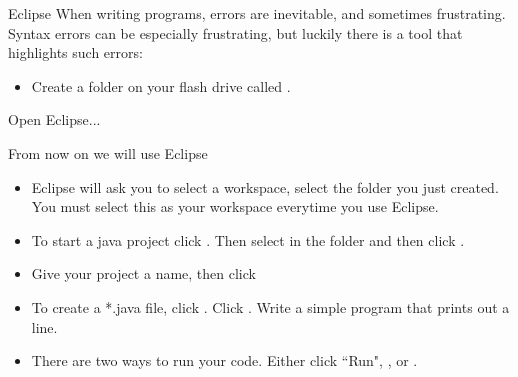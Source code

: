 \begin{frame}{Eclipse}
When writing programs, errors are inevitable, and sometimes frustrating. Syntax errors can be especially frustrating, but luckily there is a tool that highlights such errors:
\begin{itemize}
\item Create a folder on your flash drive called .
\end{itemize}

\begin{center}
Open Eclipse...
\end{center}
\end{frame}

\begin{frame}{From now on we will use Eclipse}
\begin{itemize}
\item Eclipse will ask you to select a workspace, select the  folder you just created. You must select this as your workspace everytime you use Eclipse.
\item To start a java project click . Then select  in the  folder and then click .
\item Give your project a name, then click  \pause

\item To create a *.java file, click . Click . Write a simple program that prints out a line. \pause
\item There are two ways to run your code. Either click ``Run", , or .
\end{itemize}
\end{frame}

